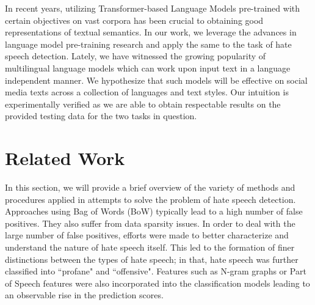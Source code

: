 \documentclass[
]{ceurart}
\begin{document}
In recent years, utilizing Transformer-based\cite{vaswani2017attention} Language Models pre-trained with certain objectives on vast corpora\cite{devlin2018bert} has been crucial to obtaining good representations of textual semantics. In our work, we leverage the advances in language model pre-training research and apply the same to the task of hate speech detection. Lately, we have witnessed the growing popularity of multilingual language models which can work upon input text in a language independent manner. We hypothesize that such models will be effective on social media texts across a collection of languages and text styles. Our intuition is experimentally verified as we are able to obtain respectable results on the provided testing data for the two tasks in question.


\section{Related Work}

In this section, we will provide a brief overview of the variety of methods and procedures applied in attempts to solve the problem of hate speech detection. Approaches using Bag of Words (BoW)\cite{Kwok2013LocateTH} typically lead to a high number of false positives. They also suffer from data sparsity issues. In order to deal with the large number of false positives, efforts were made to better characterize and understand the nature of hate speech itself. This led to the formation of finer distinctions between the types of hate speech\cite{wang2014cursing}; in that, hate speech was further classified into ``profane" and ``offensive". Features such as N-gram graphs\cite{phdthesis} or Part of Speech features\cite{chen2012detecting} were also incorporated into the classification models leading to an observable rise in the prediction scores. 
\end{document}
